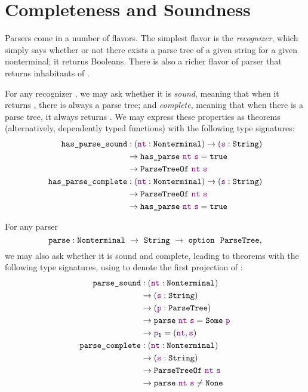 \chapter{Completeness and Soundness}\label{ch:correctness}
    Parsers come in a number of flavors.  The simplest flavor is the \emph{recognizer}, which simply says whether or not there exists a parse tree of a given string for a given nonterminal; it returns Booleans.  There is also a richer flavor of parser that returns inhabitants of .

    For any recognizer , we may ask whether it is \emph{sound}, meaning that when it returns \true, there is always a parse tree; and \emph{complete}, meaning that when there is a parse tree, it always returns \true.  We may express these properties as theorems (alternatively, dependently typed functions) with the following type signatures:
    \begin{align*}
      \fname{has\_parse\_sound} & \oftypesep
      (\oftype{\farg{nt}}{\Nonterminal})
      \typeto (\oftype{\farg{s}}{\String}) \\
      & \typeto \fname{has\_parse}~\farg{nt}~\farg{s} = \true \\
      & \typeto \indname{ParseTreeOf}~\farg{nt}~\farg{s} \\
      \fname{has\_parse\_complete} & \oftypesep
      (\oftype{\farg{nt}}{\Nonterminal})
      \typeto (\oftype{\farg{s}}{\String}) \\
      & \typeto \indname{ParseTreeOf}~\farg{nt}~\farg{s} \\
      & \typeto \fname{has\_parse}~\farg{nt}~\farg{s} = \true
    \end{align*}

    For any parser
    $$\oftype{\fname{parse}}{\Nonterminal~\typeto~\String~\typeto~\typeoption{\indname{ParseTree}}},$$
    we may also ask whether it is sound and complete, leading to theorems with the following type signatures, using  to denote the first projection of :
    \begin{align*}
      \fname{parse\_sound} & \oftypesep
      (\oftype{\farg{nt}}{\Nonterminal}) \\
      & \typeto (\oftype{\farg{s}}{\String}) \\
      & \typeto (\oftype{\farg{p}}{\indname{ParseTree}}) \\
      & \typeto \fname{parse}~\farg{nt}~\farg{s} = \Some{\farg{p}} \\
      & \typeto \proj1{\farg{p}} = (\farg{nt}, \farg{s}) \\
      \fname{parse\_complete} & \oftypesep
      (\oftype{\farg{nt}}{\Nonterminal}) \\
      & \typeto (\oftype{\farg{s}}{\String}) \\
      & \typeto \indname{ParseTreeOf}~\farg{nt}~\farg{s} \\
      & \typeto \fname{parse}~\farg{nt}~\farg{s} \neq \None \\
    \end{align*}

